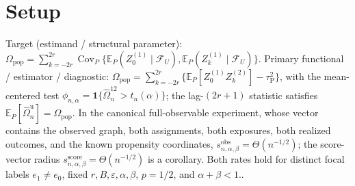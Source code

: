 \documentclass{article}
\begin{document}
\section{Setup}

Target (estimand / structural parameter): \(\Omega_{\mathrm{pop}}=\sum_{k=-2r}^{2r}\operatorname{Cov}_P\{\mathbb E_P(Z_0^{(1)}\mid\mathcal F_U),\mathbb E_P(Z_k^{(1)}\mid\mathcal F_U)\}\).
Primary functional / estimator / diagnostic: \(\Omega_{\mathrm{pop}}=\sum_{k=-2r}^{2r}\{\mathbb E_P[Z_0^{(1)}Z_k^{(2)}]-\tau_{\mathrm P}^2\}\), with the mean-centered test \(\phi_{n,\alpha}=\mathbf 1\{\widehat\Omega_n^{12}>t_n(\alpha)\}\); the lag-\((2r+1)\) statistic satisfies \(\mathbb E_P[\widehat\Omega_n^{\mathrm u}]=\Omega_{\mathrm{pop}}\).  In the canonical full-observable experiment, whose vector contains the observed graph, both assignments, both exposures, both realized outcomes, and the known propensity coordinates, \(s_{n,\alpha,\beta}^{\mathrm{obs}}=\Theta(n^{-1/2})\); the score-vector radius \(s_{n,\alpha,\beta}^{\mathrm{score}}=\Theta(n^{-1/2})\) is a corollary.  Both rates hold for distinct focal labels \(e_1\ne e_0\), fixed \(r,B,\varepsilon,\alpha,\beta\), \(p=1/2\), and \(\alpha+\beta<1\)..
\end{document}
